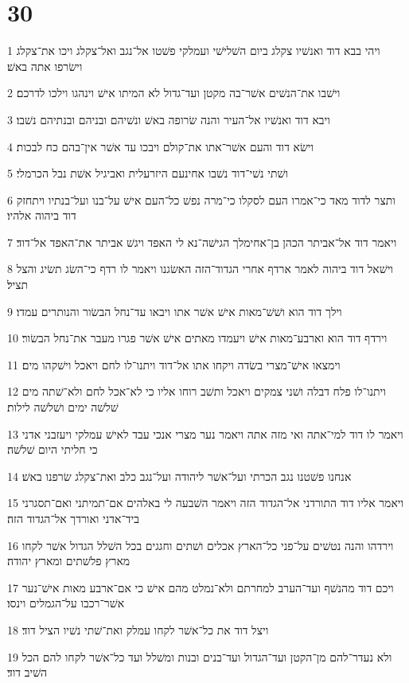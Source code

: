 \chapter{30}

\par 1 ויהי בבא דוד ואנשׁיו צקלג ביום השׁלישׁי ועמלקי פשׁטו אל־נגב ואל־צקלג ויכו את־צקלג וישׂרפו אתה באשׁ׃
\par 2 וישׁבו את־הנשׁים אשׁר־בה מקטן ועד־גדול לא המיתו אישׁ וינהגו וילכו לדרכם׃
\par 3 ויבא דוד ואנשׁיו אל־העיר והנה שׂרופה באשׁ ונשׁיהם ובניהם ובנתיהם נשׁבו׃
\par 4 וישׂא דוד והעם אשׁר־אתו את־קולם ויבכו עד אשׁר אין־בהם כח לבכות׃
\par 5 ושׁתי נשׁי־דוד נשׁבו אחינעם היזרעלית ואביגיל אשׁת נבל הכרמלי׃
\par 6 ותצר לדוד מאד כי־אמרו העם לסקלו כי־מרה נפשׁ כל־העם אישׁ על־בנו ועל־בנתיו ויתחזק דוד ביהוה אלהיו׃
\par 7 ויאמר דוד אל־אביתר הכהן בן־אחימלך הגישׁה־נא לי האפד ויגשׁ אביתר את־האפד אל־דוד׃
\par 8 וישׁאל דוד ביהוה לאמר ארדף אחרי הגדוד־הזה האשׂגנו ויאמר לו רדף כי־השׂג תשׂיג והצל תציל׃
\par 9 וילך דוד הוא ושׁשׁ־מאות אישׁ אשׁר אתו ויבאו עד־נחל הבשׂור והנותרים עמדו׃
\par 10 וירדף דוד הוא וארבע־מאות אישׁ ויעמדו מאתים אישׁ אשׁר פגרו מעבר את־נחל הבשׂור׃
\par 11 וימצאו אישׁ־מצרי בשׂדה ויקחו אתו אל־דוד ויתנו־לו לחם ויאכל וישׁקהו מים׃
\par 12 ויתנו־לו פלח דבלה ושׁני צמקים ויאכל ותשׁב רוחו אליו כי לא־אכל לחם ולא־שׁתה מים שׁלשׁה ימים ושׁלשׁה לילות׃
\par 13 ויאמר לו דוד למי־אתה ואי מזה אתה ויאמר נער מצרי אנכי עבד לאישׁ עמלקי ויעזבני אדני כי חליתי היום שׁלשׁה׃
\par 14 אנחנו פשׁטנו נגב הכרתי ועל־אשׁר ליהודה ועל־נגב כלב ואת־צקלג שׂרפנו באשׁ׃
\par 15 ויאמר אליו דוד התורדני אל־הגדוד הזה ויאמר השׁבעה לי באלהים אם־תמיתני ואם־תסגרני ביד־אדני ואורדך אל־הגדוד הזה׃
\par 16 וירדהו והנה נטשׁים על־פני כל־הארץ אכלים ושׁתים וחגגים בכל השׁלל הגדול אשׁר לקחו מארץ פלשׁתים ומארץ יהודה׃
\par 17 ויכם דוד מהנשׁף ועד־הערב למחרתם ולא־נמלט מהם אישׁ כי אם־ארבע מאות אישׁ־נער אשׁר־רכבו על־הגמלים וינסו׃
\par 18 ויצל דוד את כל־אשׁר לקחו עמלק ואת־שׁתי נשׁיו הציל דוד׃
\par 19 ולא נעדר־להם מן־הקטן ועד־הגדול ועד־בנים ובנות ומשׁלל ועד כל־אשׁר לקחו להם הכל השׁיב דוד׃
